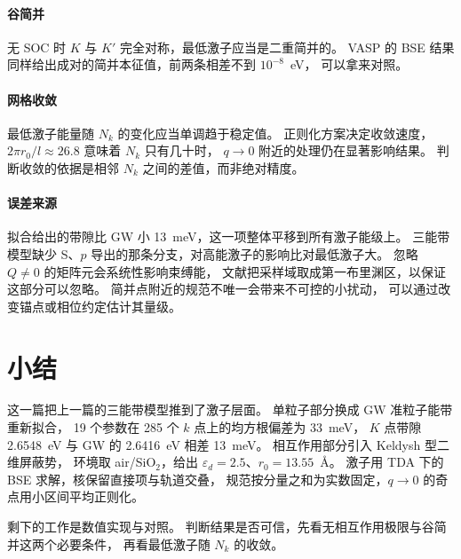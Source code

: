 \documentclass[11pt,a4paper]{ctexart}
\newcommand{\eps}{\varepsilon}
\begin{document}
\paragraph{谷简并}
无 SOC 时 $K$ 与 $K'$ 完全对称，最低激子应当是二重简并的。
VASP 的 BSE 结果同样给出成对的简并本征值，前两条相差不到 $10^{-8}$~eV，
可以拿来对照。

\paragraph{网格收敛}
最低激子能量随 $N_k$ 的变化应当单调趋于稳定值。
正则化方案决定收敛速度，$2\pi r_0/l\approx26.8$ 意味着 $N_k$ 只有几十时，
$q\to0$ 附近的处理仍在显著影响结果。
判断收敛的依据是相邻 $N_k$ 之间的差值，而非绝对精度。

\paragraph{误差来源}
拟合给出的带隙比 GW 小 13~meV，这一项整体平移到所有激子能级上。
三能带模型缺少 S、$p$ 导出的那条分支，对高能激子的影响比对最低激子大。
忽略 $Q\ne0$ 的矩阵元会系统性影响束缚能，
文献\cite{ridolfi2018}把采样域取成第一布里渊区，以保证这部分可以忽略。
简并点附近的规范不唯一会带来不可控的小扰动，
可以通过改变锚点或相位约定估计其量级。

\newpage
\section{小结}

这一篇把上一篇的三能带模型推到了激子层面。
单粒子部分换成 GW 准粒子能带重新拟合，
19 个参数在 285 个 $k$ 点上的均方根偏差为 33~meV，
$K$ 点带隙 2.6548~eV 与 GW 的 2.6416~eV 相差 13~meV。
相互作用部分引入 Keldysh 型二维屏蔽势，
环境取 air/SiO$_2$，给出 $\eps_d=2.5$、$r_0=13.55$~\AA{}。
激子用 TDA 下的 BSE 求解，核保留直接项与轨道交叠，
规范按分量之和为实数固定，$q\to0$ 的奇点用小区间平均正则化。

剩下的工作是数值实现与对照。
判断结果是否可信，先看无相互作用极限与谷简并这两个必要条件，
再看最低激子随 $N_k$ 的收敛。
\end{document}
